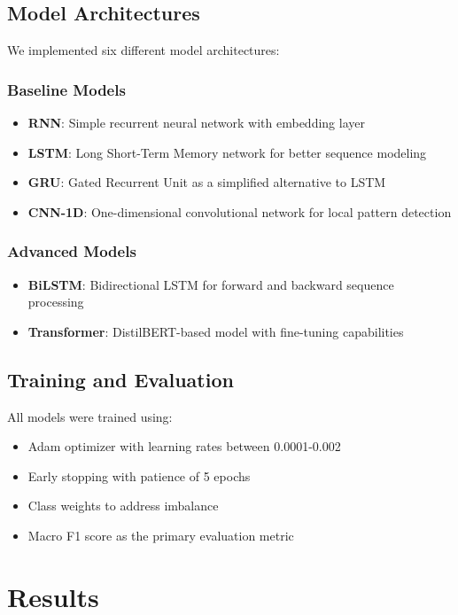 \documentclass[11pt,a4paper]{article}
\begin{document}
\subsection{Model Architectures}

We implemented six different model architectures:

\subsubsection{Baseline Models}
\begin{itemize}
    \item \textbf{RNN}: Simple recurrent neural network with embedding layer
    \item \textbf{LSTM}: Long Short-Term Memory network for better sequence modeling
    \item \textbf{GRU}: Gated Recurrent Unit as a simplified alternative to LSTM
    \item \textbf{CNN-1D}: One-dimensional convolutional network for local pattern detection
\end{itemize}

\subsubsection{Advanced Models}
\begin{itemize}
    \item \textbf{BiLSTM}: Bidirectional LSTM for forward and backward sequence processing
    \item \textbf{Transformer}: DistilBERT-based model with fine-tuning capabilities
\end{itemize}

\subsection{Training and Evaluation}

All models were trained using:
\begin{itemize}
    \item Adam optimizer with learning rates between 0.0001-0.002
    \item Early stopping with patience of 5 epochs
    \item Class weights to address imbalance
    \item Macro F1 score as the primary evaluation metric
\end{itemize}

\section{Results}
\end{document}
